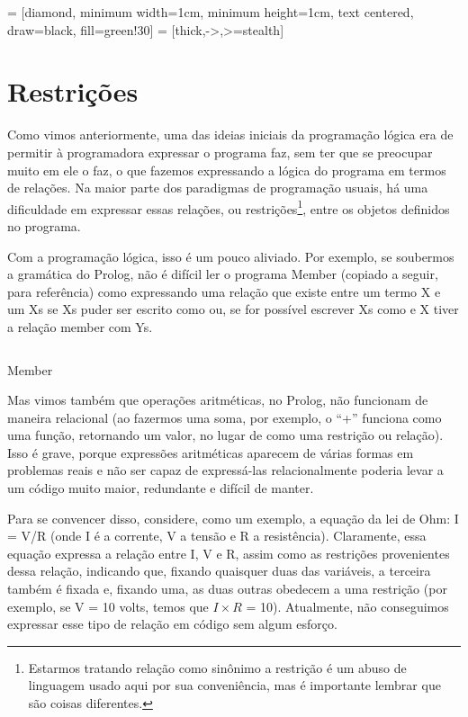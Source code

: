
%

\usetikzlibrary{shapes.geometric, arrows}
 = [diamond, minimum width=1cm, minimum height=1cm, text centered, draw=black, fill=green!30]
 = [thick,->,>=stealth]


%
%

%
\section{Restrições}

Como vimos anteriormente, uma das ideias iniciais da programação lógica era de permitir à programadora expressar  o programa faz, sem ter que se preocupar muito em  ele o faz, o que fazemos expressando a lógica do programa em termos de relações. Na maior parte dos paradigmas de programação usuais, há uma dificuldade em expressar essas relações, ou restrições\footnote{Estarmos tratando relação como sinônimo a restrição é um abuso de linguagem usado aqui por sua conveniência, mas é importante lembrar que são coisas diferentes.}, entre os objetos definidos no programa.

Com a programação lógica, isso é um pouco aliviado. Por exemplo, se soubermos a gramática do Prolog,
não é difícil ler o programa Member (copiado a seguir, para referência) como expressando uma relação
que existe entre um termo X e um Xs se Xs puder ser escrito como \codigo{[X|Xs]}
ou, se for possível escrever Xs como \codigo{[Y|Ys]} e X tiver a relação member com Ys.

    \begin{listing}
\inputminted{prolog}{../Exemplos/Cap4/prog1_member.pl}
\caption{Member}
    \end{listing}

Mas vimos também que operações aritméticas, no Prolog, não funcionam de maneira relacional (ao fazermos uma soma, por exemplo, o ``+'' funciona como uma função, retornando um valor, no lugar de como uma restrição ou relação). Isso é grave, porque expressões aritméticas aparecem de várias formas em problemas reais e não ser capaz de expressá-las relacionalmente poderia levar a um código muito maior, redundante e difícil de manter.

Para se convencer disso, considere, como um exemplo, a equação da lei de Ohm: I = V/R (onde I é a
corrente, V a tensão e R a resistência).
Claramente, essa equação expressa a relação entre I, V e R, assim como as restrições provenientes dessa relação, indicando que, fixando quaisquer duas das variáveis, a terceira também é fixada e, fixando uma, as duas outras obedecem a uma restrição (por exemplo, se V = 10 volts, temos que $I \times R$ = 10). Atualmente, não conseguimos expressar esse tipo de relação em código sem algum esforço.

